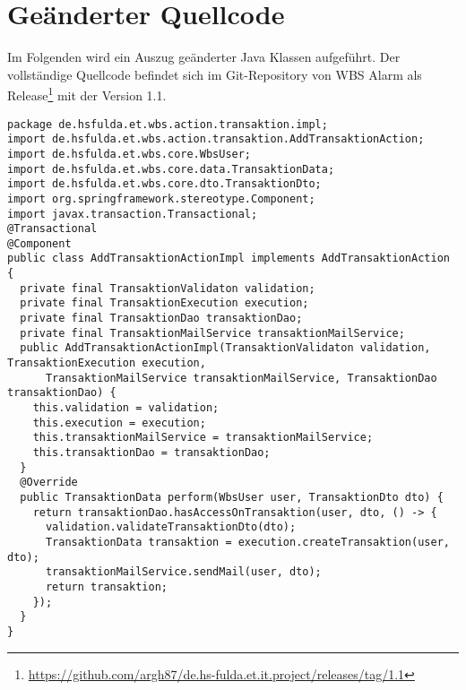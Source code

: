 \chapter{Geänderter Quellcode}
\label{ch:NeuQuellcode}

Im Folgenden wird ein Auszug geänderter Java Klassen aufgeführt. Der vollständige Quellcode befindet sich im Git-Repository von WBS Alarm als Release\footnote{\url{https://github.com/argh87/de.hs-fulda.et.it.project/releases/tag/1.1}} mit der Version 1.1.


\begin{lstlisting}[caption={Verarbeitung einer neuen Transaktion unter Verwendung von \code{TransaktionDao}. Die Klassen \code{TransaktionValidaton} und \code{TransaktionExecution} verwenden auch die neue Schnittstelle.}, label={lst:n_AddTransaktionActionImpl}]
package de.hsfulda.et.wbs.action.transaktion.impl;
import de.hsfulda.et.wbs.action.transaktion.AddTransaktionAction;
import de.hsfulda.et.wbs.core.WbsUser;
import de.hsfulda.et.wbs.core.data.TransaktionData;
import de.hsfulda.et.wbs.core.dto.TransaktionDto;
import org.springframework.stereotype.Component;
import javax.transaction.Transactional;
@Transactional
@Component
public class AddTransaktionActionImpl implements AddTransaktionAction {
  private final TransaktionValidaton validation;
  private final TransaktionExecution execution;
  private final TransaktionDao transaktionDao;
  private final TransaktionMailService transaktionMailService;
  public AddTransaktionActionImpl(TransaktionValidaton validation, TransaktionExecution execution,
      TransaktionMailService transaktionMailService, TransaktionDao transaktionDao) {
    this.validation = validation;
    this.execution = execution;
    this.transaktionMailService = transaktionMailService;
    this.transaktionDao = transaktionDao;
  }
  @Override
  public TransaktionData perform(WbsUser user, TransaktionDto dto) {
    return transaktionDao.hasAccessOnTransaktion(user, dto, () -> {
      validation.validateTransaktionDto(dto);
      TransaktionData transaktion = execution.createTransaktion(user, dto);
      transaktionMailService.sendMail(user, dto);
      return transaktion;
    });
  }
}
\end{lstlisting}

